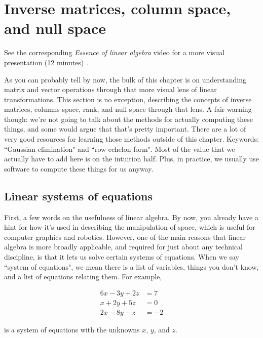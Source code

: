 \section{Inverse matrices, column space, and null space}

\begin{remark}
  See the corresponding \textit{Essence of linear algebra} video for a more
  visual presentation (12 minutes)
  \cite{bib:linalg_inverse_matrices_column_space_and_null_space}.
\end{remark}

As you can probably tell by now, the bulk of this chapter is on understanding
matrix and vector operations through that more visual lens of linear
transformations. This section is no exception, describing the concepts of
inverse matrices, columns space, rank, and null space through that lens. A fair
warning though: we're not going to talk about the methods for actually computing
these things, and some would argue that that's pretty important. There are a lot
of very good resources for learning those methods outside of this chapter.
Keywords: ``Gaussian elimination" and ``row echelon form". Most of the value
that we actually have to add here is on the intuition half. Plus, in practice,
we usually use software to compute these things for us anyway.

\subsection{Linear systems of equations}

First, a few words on the usefulness of linear algebra. By now, you already have
a hint for how it's used in describing the manipulation of space, which is
useful for computer graphics and robotics. However, one of the main reasons that
linear algebra is more broadly applicable, and required for just about any
technical discipline, is that it lets us solve certain systems of equations.
When we say ``system of equations", we mean there is a list of variables, things
you don't know, and a list of equations relating them. For example,

\begin{align*}
  6x - 3y + 2z &= 7 \\
  x + 2y + 5z &= 0 \\
  2x - 8y - z &= -2
\end{align*}

is a system of equations with the unknowns $x$, $y$, and $z$.

